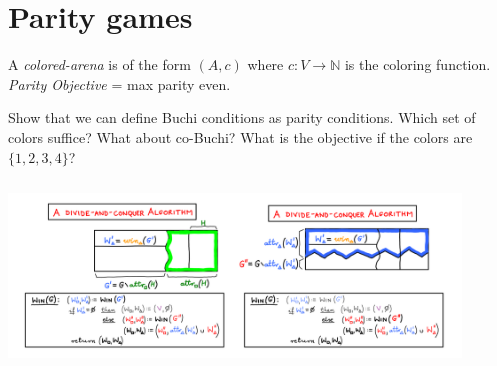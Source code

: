 \documentclass[a4paper,10pt]{article}
\begin{document}
\section{Parity games}

A \emph{colored-arena} is of the form $(A,c)$ where $c:V \to \mathbb{N}$ is the coloring function.
\emph{Parity Objective} = max parity even.

Show that we can define Buchi conditions as parity conditions. Which set of colors suffice? What about co-Buchi? What is the objective if the colors are $\{1,2,3,4\}$?

\begin{center}\includegraphics[width=12cm,height=5cm]{parity.png} \end{center}
\end{document}
